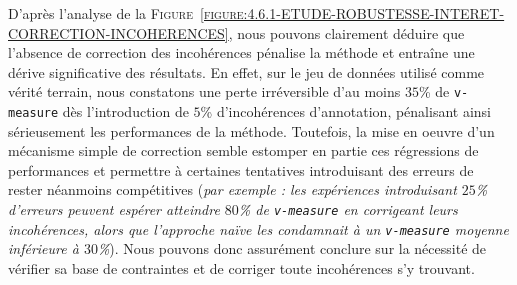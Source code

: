 			D'après l'analyse de la \textsc{Figure~\ref{figure:4.6.1-ETUDE-ROBUSTESSE-INTERET-CORRECTION-INCOHERENCES}}, nous pouvons clairement déduire que l'absence de correction des incohérences pénalise la méthode et entraîne une dérive significative des résultats.
			En effet, sur le jeu de données utilisé comme vérité terrain, nous constatons une perte irréversible d'au moins $35$\% de \texttt{v-measure} dès l'introduction de $5$\% d'incohérences d'annotation, pénalisant ainsi sérieusement les performances de la méthode.
			Toutefois, la mise en oeuvre d'un mécanisme simple de correction semble estomper en partie ces régressions de performances et permettre à certaines tentatives introduisant des erreurs de rester néanmoins compétitives
			(\textit{par exemple : les expériences introduisant $25$\% d'erreurs peuvent espérer atteindre $80$\% de \texttt{v-measure} en corrigeant leurs incohérences, alors que l'approche naïve les condamnait à un \texttt{v-measure} moyenne inférieure à $30$\%}).
			Nous pouvons donc assurément conclure sur la nécessité de vérifier sa base de contraintes et de corriger toute incohérences s'y trouvant.
			
